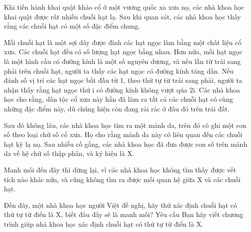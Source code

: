 Khi tiến hành khai quật khảo cổ ở một vương quốc xa xưa nọ, các nhà khoa học khai quật được rất nhiều chuỗi hạt lạ. Sau khi quan sát, các nhà khoa học thấy rằng các chuỗi hạt có một số đặc điểm chung.  

   Mỗi chuỗi hạt là một sợi dây được đính các hạt ngọc làm bằng một chất liệu cổ xưa. Các chuỗi hạt đều có số lượng hạt ngọc bằng nhau. Hơn nữa, mỗi hạt ngọc là một hình cầu có đường kính là một số nguyên dương, và nếu lần từ trái sang phải trên chuỗi hạt, người ta thấy các hạt ngọc có đường kính tăng dần. Nếu đánh số vị trí các hạt ngọc bắt đầu từ 1, theo thứ tự từ trái sang phải, người ta nhận thấy rằng hạt ngọc thứ i có đường kính không vượt qúa 2i. Các nhà khoa học cho rằng, dân tộc cổ xưa này hẳn đã làm ra tất cả các chuỗi hạt có cùng những đặc điểm này, dù chúng hiện còn đang rải rác ở đâu đó trên trái đất.  

   Sau đó không lâu, các nhà khoa học tìm ra một mảnh da, trên đó có ghi một con số theo loại chữ số cổ xưa. Họ cho rằng mảnh da này có liên quan đến các chuỗi hạt kỳ lạ nọ. Sau nhiều cố gắng, các nhà khoa học đã đưa được con số trên mảnh da về hệ chữ số thập phân, và ký hiệu là X.  

   Manh mối đến đây thì dừng lại, vì các nhà khoa học không tìm thấy được vết tích nào khác nữa, và cũng không tìm ra được mối quan hệ giữa X và các chuỗi hạt.  

   Đến đây, một nhà khoa học người Việt đề nghị, hãy thử xác định chuỗi hạt có thứ tự từ điển là X, biết đâu đây sẽ là manh mối?
Yêu cầu
Bạn hãy viết chương trình giúp nhà khoa học xác định chuỗi hạt có thứ tự từ điển là X.